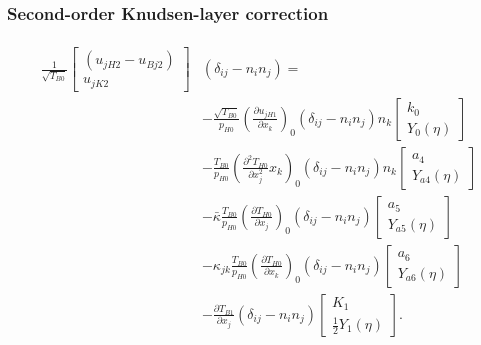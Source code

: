 \documentclass[mathserif]{beamer} %
\newcommand{\pder}[2][]{\frac{\partial#1}{\partial#2}}
\newcommand{\pderder}[2][]{\frac{\partial^2 #1}{\partial #2^2}}
\newcommand{\deltann}[2]{(\delta_{#1#2}-n_#1 n_#2)}
\newcommand{\onwall}[1]{\left(#1\right)_0}
\begin{document}
\begin{frame}
    \frametitle{Second-order Knudsen-layer correction}
    \footnotesize
    \begin{gather}
        \begin{aligned}
            \frac1{\sqrt{T_{B0}}}
                \begin{bmatrix} (u_{jH2} - u_{Bj2}) \\ u_{jK2} \end{bmatrix}&\deltann{i}{j} = \\
            &- \frac{\sqrt{T_{B0}}}{p_{H0}}\onwall{\pder[u_{jH1}]{x_k}} \deltann{i}{j}n_k
                \begin{bmatrix} k_0 \\ Y_0(\eta) \end{bmatrix} \\
            &- \frac{T_{B0}}{p_{H0}}\onwall{\pderder[T_{H0}]{x_j}{x_k}} \deltann{i}{j}n_k
                \begin{bmatrix} a_4 \\ Y_{a4}(\eta) \end{bmatrix} \\
            &- \bar\kappa\frac{T_{B0}}{p_{H0}}\onwall{\pder[T_{H0}]{x_j}} \deltann{i}{j}
                \begin{bmatrix} a_5 \\ Y_{a5}(\eta) \end{bmatrix} \\
            &- \kappa_{jk}\frac{T_{B0}}{p_{H0}}\onwall{\pder[T_{H0}]{x_k}} \deltann{i}{j}
                \begin{bmatrix} a_6 \\ Y_{a6}(\eta) \end{bmatrix} \\
            &- \pder[T_{B1}]{x_j} \deltann{i}{j}
                \begin{bmatrix} K_1 \\ \frac12 Y_1(\eta) \end{bmatrix}.
        \end{aligned}\label{eq:boundary_u2t}
    \end{gather}
\end{frame}
\end{document}
